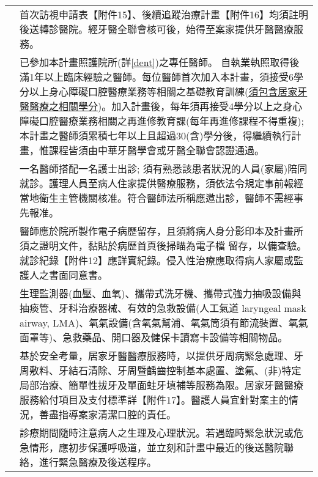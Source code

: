 \begin{longtable}{p{1.3in}p{4.8in}}

\color{OliveGreen}{事前申請}
 & 首次訪視申請表【附件15】、後續追蹤治療計畫【附件16】均須註明後送轉診醫院。經牙醫全聯會核可後，始得至案家提供牙醫醫療服務。 \\
 
\color{OliveGreen}{醫師資格}
& 已參加本計畫照護院所(詳\ref{dent})之專任醫師。
自執業執照取得後滿1年以上臨床經驗之醫師。每位醫師首次加入本計畫，須接受6學分以上身心障礙口腔醫療業務等相關之基礎教育訓練(\underline{須包含居家牙醫醫療之相關學分})。加入計畫後，每年須再接受4學分以上之身心障礙口腔醫療業務相關之再進修教育課(每年再進修課程不得重複);本計畫之醫師須累積七年以上且超過30(含)學分後，得繼續執行計畫，惟課程皆須由中華牙醫學會或牙醫全聯會認證通過。 \\

\color{OliveGreen}{到宅小組}
 & 一名醫師搭配一名護士出診; 須有熟悉該患者狀況的人員(家屬)陪同就診。護理人員至病人住家提供醫療服務，須依法令規定事前報經當地衛生主管機關核准。符合醫師法所稱應邀出診，醫師不需經事先報准。\\
 
\color{OliveGreen}{就診文書}
& 醫師應於院所製作電子病歷留存，且須將病人身分影印本及計畫所須之證明文件，黏貼於病歷首頁後掃瞄為電子檔 留存，以備查驗。就診紀錄【附件12】應詳實紀錄。侵入性治療應取得病人家屬或監護人之書面同意書。\\
 
\color{OliveGreen}{攜帶設備}
& 生理監測器(血壓、血氧)、攜帶式洗牙機、攜帶式強力抽吸設備與抽痰管、牙科治療器械、有效的急救設備(人工氣道 laryngeal mask airway, LMA)、氧氣設備(含氧氣幫浦、氧氣筒須有節流裝置、氧氣面罩等)、急救藥品、開口器及健保卡讀寫卡設備等相關物品。\\

\color{OliveGreen}{照護內容}
& 基於安全考量，居家牙醫醫療服務時，以提供牙周病緊急處理、牙周敷料、牙結石清除、牙周暨齲齒控制基本處置、塗氟、(非)特定局部治療、簡單性拔牙及單面蛀牙填補等服務為限。居家牙醫醫療服務給付項目及支付標準詳【附件17】。醫護人員宜針對案主的情況，善盡指導案家清潔口腔的責任。\\

\color{OliveGreen}{病人安全}
& 診療期間隨時注意病人之生理及心理狀況。若遇臨時緊急狀況或危急情形，應初步保護呼吸道，並立刻和計畫中最近的後送醫院聯絡，進行緊急醫療及後送程序。\\



\end{longtable}
